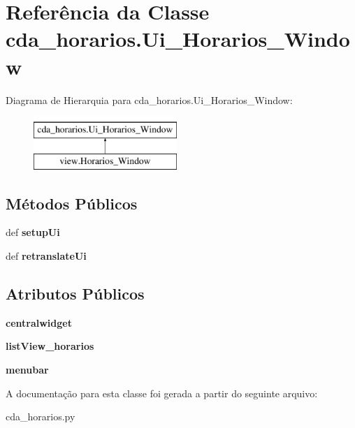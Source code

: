 \hypertarget{classcda__horarios_1_1Ui__Horarios__Window}{\section{\-Referência da \-Classe cda\-\_\-horarios.\-Ui\-\_\-\-Horarios\-\_\-\-Window}
\label{classcda__horarios_1_1Ui__Horarios__Window}
}
\-Diagrama de \-Hierarquia para cda\-\_\-horarios.\-Ui\-\_\-\-Horarios\-\_\-\-Window\-:\begin{figure}[H]
\begin{center}
\leavevmode
\includegraphics[height=2.000000cm]{classcda__horarios_1_1Ui__Horarios__Window}
\end{center}
\end{figure}
\subsection*{\-Métodos \-Públicos}
\begin{DoxyCompactItemize}
\item 
\hypertarget{classcda__horarios_1_1Ui__Horarios__Window_af117f70ecc850560457f1217fdbd744d}{def {\bfseries setup\-Ui}}\label{classcda__horarios_1_1Ui__Horarios__Window_af117f70ecc850560457f1217fdbd744d}

\item 
\hypertarget{classcda__horarios_1_1Ui__Horarios__Window_a20ad3c9197b32ecfceddfd295dc59d43}{def {\bfseries retranslate\-Ui}}\label{classcda__horarios_1_1Ui__Horarios__Window_a20ad3c9197b32ecfceddfd295dc59d43}

\end{DoxyCompactItemize}
\subsection*{\-Atributos \-Públicos}
\begin{DoxyCompactItemize}
\item 
\hypertarget{classcda__horarios_1_1Ui__Horarios__Window_a20a0ae07168eae27e949f77a3efbf6b4}{{\bfseries centralwidget}}\label{classcda__horarios_1_1Ui__Horarios__Window_a20a0ae07168eae27e949f77a3efbf6b4}

\item 
\hypertarget{classcda__horarios_1_1Ui__Horarios__Window_af6b05e251d544088798421933b8ab417}{{\bfseries list\-View\-\_\-horarios}}\label{classcda__horarios_1_1Ui__Horarios__Window_af6b05e251d544088798421933b8ab417}

\item 
\hypertarget{classcda__horarios_1_1Ui__Horarios__Window_a40cf7a918df3c2cff910b6f6842a5c99}{{\bfseries menubar}}\label{classcda__horarios_1_1Ui__Horarios__Window_a40cf7a918df3c2cff910b6f6842a5c99}

\end{DoxyCompactItemize}


\-A documentação para esta classe foi gerada a partir do seguinte arquivo\-:\begin{DoxyCompactItemize}
\item 
cda\-\_\-horarios.\-py\end{DoxyCompactItemize}
